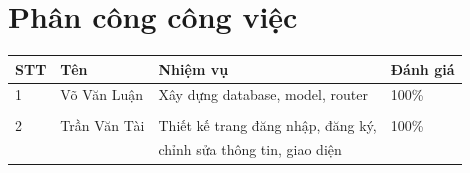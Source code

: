 \documentclass[a4paper]{article}
\begin{document}
\section*{Phân công công việc}
        \begin{table}[h]
        \centering
            \begin{tabular}{|l|l|l|l|}
            \hline
            STT & Tên & Nhiệm vụ & Đánh giá\\
            \hline
            1 & Võ Văn Luận & Xây dựng database, model, router & 100\%\\
              & &         & \\
            \hline
            2 & Trần Văn Tài & Thiết kế trang đăng nhập, đăng ký, & 100\%\\
              & & chỉnh sửa thông tin, giao diện &\\
            \hline
            \end{tabular}
        \end{table}  

\listoffigures
\newpage
\end{document}
